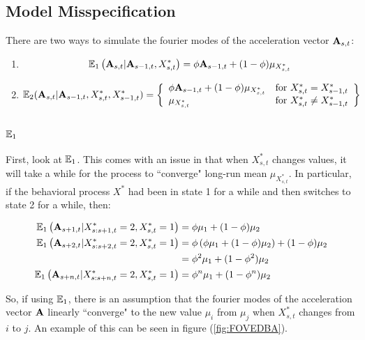 \iffalse
\subsection{Model Misspecification}

There are two ways to simulate the fourier modes of the acceleration vector $\mathbf{A}_{s,t}$:

\begin{enumerate}
	\item $$\mathbb{E}_1\left(\mathbf{A}_{s,t} | \mathbf{A}_{s-1,t}, X^*_{s,t}\right) = \phi \mathbf{A}_{s-1,t} + (1-\phi) \mu_{X^*_{s,t}} $$
	
	\item $$\mathbb{E}_2(\mathbf{A}_{s,t} | \mathbf{A}_{s-1,t}, X^*_{s,t}, X^*_{s-1,t}) = \left\{\begin{array}{lr}
	\phi \mathbf{A}_{s-1,t} + (1-\phi) \mu_{X^*_{s,t}} & \text{for } X^*_{s,t} = X^*_{s-1,t}\\
	\mu_{X^*_{s,t}} & \text{for } X^*_{s,t} \neq X^*_{s-1,t}
	\end{array}\right\}$$
\end{enumerate}

\subsubsection{$\mathbb{E}_1$}

First, look at $\mathbb{E}_1$. This comes with an issue in that when $X^*_{s,t}$ changes values, it will take a while for the process to ``converge" long-run mean $\mu_{X^*_{s,t}}$. In particular, if the behavioral process $X^*$ had been in state 1 for a while and then switches to state 2 for a while, then:

\begin{align*}
	\mathbb{E}_1\left(\mathbf{A}_{s+1,t}|X^*_{s:s+1,t} = 2, X^*_{s,t} = 1\right) &=  \phi \mu_1 + (1-\phi) \mu_2 \\
	\mathbb{E}_1\left(\mathbf{A}_{s+2,t}|X^*_{s:s+2,t} = 2, X^*_{s,t} = 1\right) &= \phi\left( \phi \mu_1 + (1-\phi) \mu_2\right) + (1-\phi)\mu_2 \\
	&= \phi^2 \mu_1 + (1-\phi^2) \mu_2\\
	\mathbb{E}_1\left(\mathbf{A}_{s+n,t}|X^*_{s:s+n,t} = 2, X^*_{s,t} = 1\right) &=  \phi^n \mu_1 + (1-\phi^n) \mu_2 \\
\end{align*}

So, if using $\mathbb{E}_1$, there is an assumption that the fourier modes of the acceleration vector $\mathbf{A}$ linearly ``converge" to the new value $\mu_i$ from $\mu_j$ when $X^*_{s,t}$ changes from $i$ to $j$. An example of this can be seen in figure (\ref{fig:FOVEDBA}).

